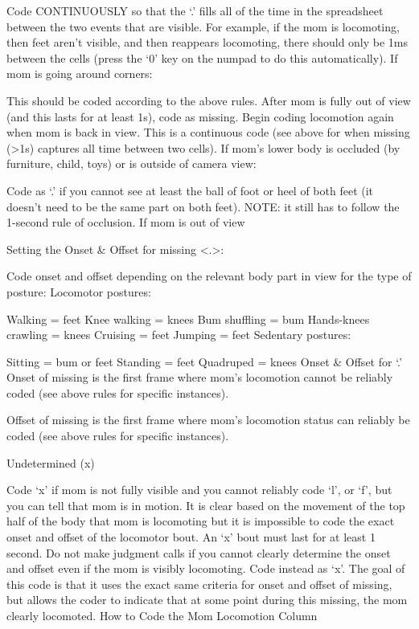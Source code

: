 \documentclass[
]{book}
\begin{document}
Code CONTINUOUSLY so that the `.' fills all of the time in the spreadsheet between the two events that are visible. For example, if the mom is locomoting, then feet aren't visible, and then reappears locomoting, there should only be 1ms between the cells (press the `0' key on the numpad to do this automatically).
If mom is going around corners:

This should be coded according to the above rules. After mom is fully out of view (and this lasts for at least 1s), code as missing. Begin coding locomotion again when mom is back in view. This is a continuous code (see above for when missing (\textgreater1s) captures all time between two cells).
If mom's lower body is occluded (by furniture, child, toys) or is outside of camera view:

Code as `.' if you cannot see at least the ball of foot or heel of both feet (it doesn't need to be the same part on both feet). NOTE: it still has to follow the 1-second rule of occlusion.
If mom is out of view

Setting the Onset \& Offset for missing \textless.\textgreater:

Code onset and offset depending on the relevant body part in view for the type of posture:
Locomotor postures:

Walking = feet
Knee walking = knees
Bum shuffling = bum
Hands-knees crawling = knees
Cruising = feet
Jumping = feet
Sedentary postures:

Sitting = bum or feet
Standing = feet
Quadruped = knees
Onset \& Offset for `.'
Onset of missing is the first frame where mom's locomotion cannot be reliably coded (see above rules for specific instances).

Offset of missing is the first frame where mom's locomotion status can reliably be coded (see above rules for specific instances).

Undetermined (x)

Code `x' if mom is not fully visible and you cannot reliably code `l', or `f', but you can tell that mom is in motion. It is clear based on the movement of the top half of the body that mom is locomoting but it is impossible to code the exact onset and offset of the locomotor bout. An `x' bout must last for at least 1 second.
Do not make judgment calls if you cannot clearly determine the onset and offset even if the mom is visibly locomoting. Code instead as `x'.
The goal of this code is that it uses the exact same criteria for onset and offset of missing, but allows the coder to indicate that at some point during this missing, the mom clearly locomoted.
How to Code the Mom Locomotion Column
\end{document}
